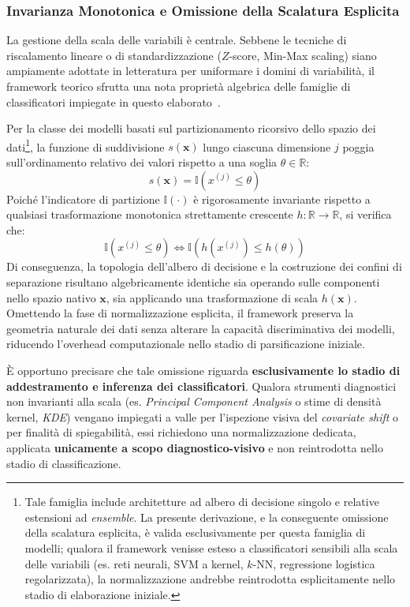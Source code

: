 \subsubsection{Invarianza Monotonica e Omissione della Scalatura Esplicita}
\label{subsubsec:invarianza_monotonica}
La gestione della scala delle variabili è centrale. Sebbene le tecniche di riscalamento lineare o di standardizzazione ($Z$-score, Min-Max scaling) siano ampiamente adottate in letteratura per uniformare i domini di variabilità, il framework teorico sfrutta una nota proprietà algebrica delle famiglie di classificatori impiegate in questo elaborato~\cite{breiman1984,hastie2009}.

Per la classe dei modelli basati sul partizionamento ricorsivo dello spazio dei dati\footnote{Tale famiglia include architetture ad albero di decisione singolo e relative estensioni ad \textit{ensemble}. La presente derivazione, e la conseguente omissione della scalatura esplicita, è valida esclusivamente per questa famiglia di modelli; qualora il framework venisse esteso a classificatori sensibili alla scala delle variabili (es. reti neurali, SVM a kernel, $k$-NN, regressione logistica regolarizzata), la normalizzazione andrebbe reintrodotta esplicitamente nello stadio di elaborazione iniziale.}, la funzione di suddivisione $s(\mathbf{x})$ lungo ciascuna dimensione $j$ poggia sull'ordinamento relativo dei valori rispetto a una soglia $\theta \in \mathbb{R}$:
\begin{equation}
    s(\mathbf{x}) = \mathbb{I}\left(x^{(j)} \le \theta\right)
\end{equation}
Poiché l'indicatore di partizione $\mathbb{I}(\cdot)$ è rigorosamente invariante rispetto a qualsiasi trasformazione monotonica strettamente crescente $h: \mathbb{R} \rightarrow \mathbb{R}$, si verifica che:
\begin{equation}
    \mathbb{I}\left(x^{(j)} \le \theta\right) \iff \mathbb{I}\left(h(x^{(j)}) \le h(\theta)\right)
\end{equation}
Di conseguenza, la topologia dell'albero di decisione e la costruzione dei confini di separazione risultano algebricamente identiche sia operando sulle componenti nello spazio nativo $\mathbf{x}$, sia applicando una trasformazione di scala $h(\mathbf{x})$. Omettendo la fase di normalizzazione esplicita, il framework preserva la geometria naturale dei dati senza alterare la capacità discriminativa dei modelli, riducendo l'overhead computazionale nello stadio di parsificazione iniziale.

\`E opportuno precisare che tale omissione riguarda \textbf{esclusivamente lo stadio di addestramento e inferenza dei classificatori}. Qualora strumenti diagnostici non invarianti alla scala (es. \textit{Principal Component Analysis} o stime di densità kernel, \textit{KDE}) vengano impiegati a valle per l'ispezione visiva del \textit{covariate shift} o per finalità di spiegabilità, essi richiedono una normalizzazione dedicata, applicata \textbf{unicamente a scopo diagnostico-visivo} e non reintrodotta nello stadio di classificazione.

